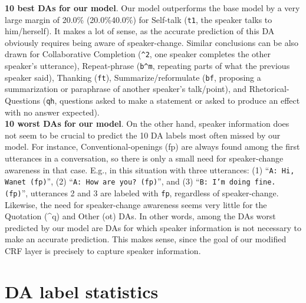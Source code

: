 \documentclass[11pt,a4paper]{article}
\begin{document}
\noindent \textbf{10 best DAs for our model}.
Our model outperforms the base model by a very large margin of 20.0\% (20.0\%40.0\%) for Self-talk (\texttt{t1}, the speaker talks to him/herself).
It makes a lot of sense, as the accurate prediction of this DA obviously requires being aware of speaker-change.
Similar conclusions can be also drawn for Collaborative Completion (\texttt{\^{}2}, one speaker completes the other speaker's utterance), Repeat-phrase (\texttt{b\^{}m}, repeating parts of what the previous speaker said), Thanking (\texttt{ft}), Summarize/reformulate (\texttt{bf}, proposing a summarization or paraphrase of another speaker's talk/point), and Rhetorical-Questions (\texttt{qh}, questions asked to make a statement or asked to produce an effect with no answer expected).\\

\noindent \textbf{10 worst DAs for our model}.
On the other hand, speaker information does not seem to be crucial to predict the 10 DA labels most often missed by our model.
For instance, Conventional-openings (fp) are always found among the first utterances in a conversation, so there is only a small need for speaker-change awareness in that case.
E.g., in this situation with three utterances: (1) ``{\small \texttt{A: Hi, Wanet (fp)}}'', (2) ``{\small \texttt{A: How are you? (fp)}}'', and (3) ``{\small \texttt{B: I'm doing fine. (fp)}}'', utterances 2 and 3 are labeled with \texttt{fp}, regardless of speaker-change.
Likewise, the need for speaker-change awareness seems very little for the Quotation (\^{}q) and Other (ot) DAs.
In other words, among the DAs worst predicted by our model are DAs for which speaker information is not necessary to make an accurate prediction.
This makes sense, since the goal of our modified CRF layer is precisely to capture speaker information.

\section{DA label statistics}\label{app:da_label_statistics}
\end{document}
